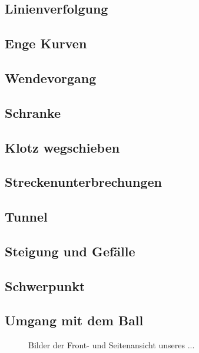 \documentclass[12pt]{article}
\begin{document}
\subsection{Linienverfolgung}

\subsection{Enge Kurven}

\subsection{Wendevorgang}

\subsection{Schranke}

\subsection{Klotz wegschieben}

\subsection{Streckenunterbrechungen}

\subsection{Tunnel}

\subsection{Steigung und Gefälle}

\subsection{Schwerpunkt}

\subsection{Umgang mit dem Ball}

\begin{figure}[H]
  \centering
  \caption{Bilder der Front- und Seitenansicht unseres ...}  %
  
  \label{Figure:RobotPics}  %
\end{figure}
\end{document}
